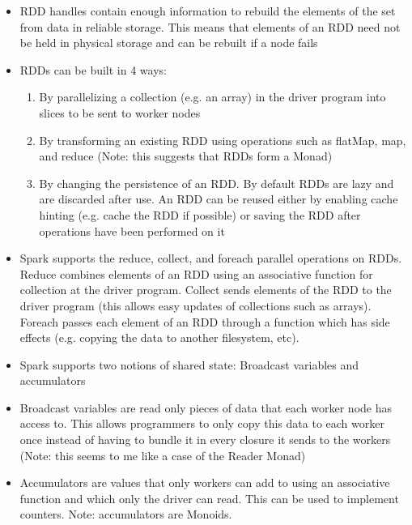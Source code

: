 \documentclass[a4paper]{article}
\begin{document}
\begin{itemize}
\begin{itemize}
\begin{itemize}
\item RDD handles contain enough information to rebuild the elements of the set from data in reliable storage. This means that elements of an RDD need not be held in physical storage and can be rebuilt if a node fails

\item RDDs can be built in 4 ways:
\begin{enumerate}
\item By parallelizing a collection (e.g. an array) in the driver program into slices to be sent to worker nodes

\item By transforming an existing RDD using operations such as flatMap, map, and reduce (Note: this suggests that RDDs form a Monad)

\item By changing the persistence of an RDD. By default RDDs are lazy and are discarded after use. An RDD can be reused either by enabling cache hinting (e.g. cache the RDD if possible) or saving the RDD after operations have been performed on it
\end{enumerate}

\item Spark supports the reduce, collect, and foreach parallel operations on RDDs. Reduce combines elements of an RDD using an associative function for collection at the driver program. Collect sends elements of the RDD to the driver program (this allows easy updates of collections such as arrays). Foreach passes each element of an RDD through a function which has side effects (e.g. copying the data to another filesystem, etc). 

\item Spark supports two notions of shared state: Broadcast variables and accumulators

\item Broadcast variables are read only pieces of data that each worker node has access to. This allows programmers to only copy this data to each worker once instead of having to bundle it in every closure it sends to the workers (Note: this seems to me like a case of the Reader Monad)

\item Accumulators are values that only workers can add to using an associative function and which only the driver can read. This can be used to implement counters. Note: accumulators are Monoids. 

\end{itemize}


\end{itemize}
\end{itemize}
\end{document}

